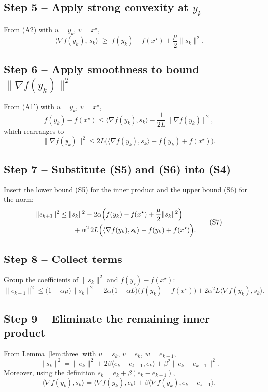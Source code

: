 \documentclass{article}
\begin{document}
\subsection*{Step 5 – Apply strong convexity at $y_{k}$}
From (A2) with $u=y_{k}$, $v=x^{\star}$,
\[
\langle\nabla f(y_{k}),\,s_{k}\rangle
\;\ge\; f(y_{k})-f(x^{\star})+\frac{\mu}{2}\|s_{k}\|^{2}. \tag{S5}
\]

\subsection*{Step 6 – Apply smoothness to bound $\|\nabla f(y_{k})\|^{2}$}
From (A1') with $u=y_{k}$, $v=x^{\star}$,
\[
f(y_{k})-f(x^{\star})\le 
\langle\nabla f(y_{k}),s_{k}\rangle-\frac{1}{2L}\|\nabla f(y_{k})\|^{2},
\]
which rearranges to
\[
\|\nabla f(y_{k})\|^{2}\le 2L\bigl(\langle\nabla f(y_{k}),s_{k}\rangle-
f(y_{k})+f(x^{\star})\bigr). \tag{S6}
\]

\subsection*{Step 7 – Substitute (S5) and (S6) into (S4)}
Insert the lower bound (S5) for the inner product and the upper bound (S6) for the norm:
\[
\begin{aligned}
\|e_{k+1}\|^{2}
&\le \|s_{k}\|^{2}
-2\alpha\Bigl(f(y_{k})-f(x^{\star})+\frac{\mu}{2}\|s_{k}\|^{2}\Bigr)\\
&\qquad +\alpha^{2}\,2L\Bigl(\langle\nabla f(y_{k}),s_{k}\rangle-
f(y_{k})+f(x^{\star})\Bigr). 
\end{aligned}
\tag{S7}
\]

\subsection*{Step 8 – Collect terms}
Group the coefficients of $\|s_{k}\|^{2}$ and $f(y_{k})-f(x^{\star})$:
\[
\|e_{k+1}\|^{2}
\le\bigl(1-\alpha\mu\bigr)\|s_{k}\|^{2}
-2\alpha\bigl(1-\alpha L\bigr)\bigl(f(y_{k})-f(x^{\star})\bigr)
+2\alpha^{2}L\langle\nabla f(y_{k}),s_{k}\rangle . \tag{S8}
\]

\subsection*{Step 9 – Eliminate the remaining inner product}
From Lemma~\ref{lem:three} with $u=s_{k}$, $v=e_{k}$, $w=e_{k-1}$,
\[
\|s_{k}\|^{2}= \|e_{k}\|^{2}+2\beta\langle e_{k}-e_{k-1},e_{k}\rangle
+\beta^{2}\|e_{k}-e_{k-1}\|^{2}. \tag{S9}
\]
Moreover, using the definition $s_{k}=e_{k}+ \beta(e_{k}-e_{k-1})$,
\[
\langle\nabla f(y_{k}),s_{k}\rangle
=\langle\nabla f(y_{k}),e_{k}\rangle
+\beta\langle\nabla f(y_{k}),e_{k}-e_{k-1}\rangle . \tag{S10}
\]
\end{document}
